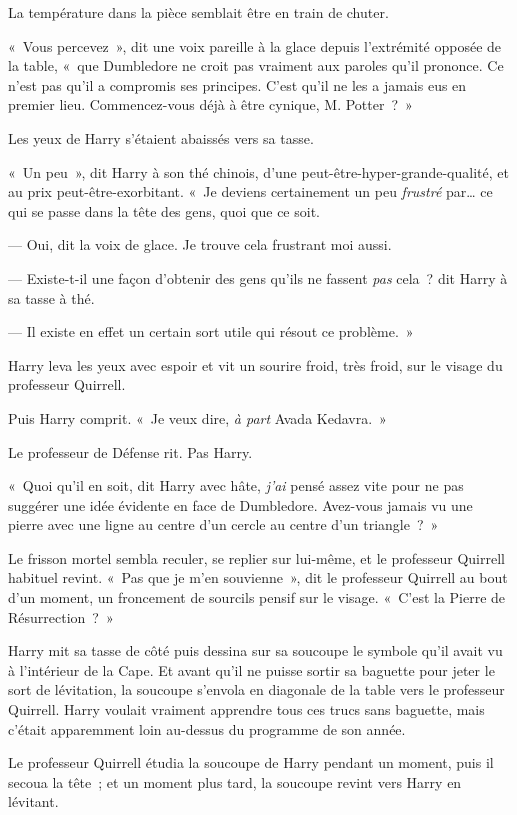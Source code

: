 La température dans la pièce semblait être en train de chuter.

«~Vous percevez~», dit une voix pareille à la glace depuis l'extrémité opposée de la table, «~que Dumbledore ne croit pas vraiment aux paroles qu'il prononce. Ce n'est pas qu'il a compromis ses principes. C'est qu'il ne les a jamais eus en premier lieu. Commencez-vous déjà à être cynique, M. Potter~?~»

Les yeux de Harry s'étaient abaissés vers sa tasse.

«~Un peu~», dit Harry à son thé chinois, d'une peut-être-hyper-grande-qualité, et au prix peut-être-exorbitant. «~Je deviens certainement un peu \emph{frustré} par… ce qui se passe dans la tête des gens, quoi que ce soit.

--- Oui, dit la voix de glace. Je trouve cela frustrant moi aussi.

--- Existe-t-il une façon d'obtenir des gens qu'ils ne fassent \emph{pas} cela~? dit Harry à sa tasse à thé.

--- Il existe en effet un certain sort utile qui résout ce problème.~»

Harry leva les yeux avec espoir et vit un sourire froid, très froid, sur le visage du professeur Quirrell.

Puis Harry comprit. «~Je veux dire, \emph{à part} Avada Kedavra.~»

Le professeur de Défense rit. Pas Harry.

«~Quoi qu'il en soit, dit Harry avec hâte, \emph{j'ai} pensé assez vite pour ne pas suggérer une idée évidente en face de Dumbledore. Avez-vous jamais vu une pierre avec une ligne au centre d'un cercle au centre d'un triangle~?~»

Le frisson mortel sembla reculer, se replier sur lui-même, et le professeur Quirrell habituel revint. «~Pas que je m'en souvienne~», dit le professeur Quirrell au bout d'un moment, un froncement de sourcils pensif sur le visage. «~C'est la Pierre de Résurrection~?~»

Harry mit sa tasse de côté puis dessina sur sa soucoupe le symbole qu'il avait vu à l'intérieur de la Cape. Et avant qu'il ne puisse sortir sa baguette pour jeter le sort de lévitation, la soucoupe s'envola en diagonale de la table vers le professeur Quirrell. Harry voulait vraiment apprendre tous ces trucs sans baguette, mais c'était apparemment loin au-dessus du programme de son année.

Le professeur Quirrell étudia la soucoupe de Harry pendant un moment, puis il secoua la tête~; et un moment plus tard, la soucoupe revint vers Harry en lévitant.

